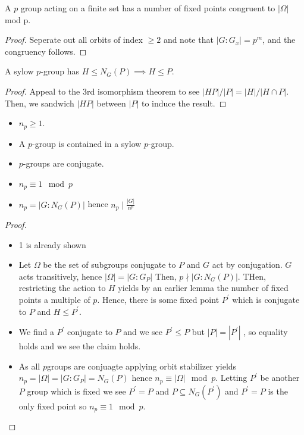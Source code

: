 \begin{theorem}
	A \(p\) group acting on a finite set has a number of fixed points congruent to \(\left| \Omega \right| \)  mod p.
\end{theorem}
\begin{proof}
	Seperate out all orbits of index \(\ge 2\) and note that \(\left| G : G_{x} \right|  = p^{m}\), and the congruency follows.
\end{proof}
\begin{theorem}
	A sylow \(p\)-group has \(H \le N_{G}\left( P \right) \implies H \le P\).
\end{theorem}
\begin{proof}
	Appeal to the 3rd isomorphism theorem to see \(\left| HP \right|/ \left| P \right|  = \left| H \right| / \left| H \cap P \right| \). Then, we sandwich \(\left| HP \right| \) between \(\left| P \right| \)  to induce the result.
\end{proof}
\begin{theorem}
	\begin{itemize}
		\item  \(n_{p} \ge 1\).
			\item A \(p\)-group is contained in a sylow \(p\)-group.
				\item \(p\)-groups are conjugate.
				\item \(n_{p} \equiv 1 \mod p\)
				\item \(n_{p} = \left| G : N_{G}\left( P \right)  \right| \) hence \(n_{p}\mid \frac{\left| G \right| }{n^{p}}\)
	\end{itemize}
\end{theorem}
\begin{proof}
	\begin{itemize}
		\item 1 is already shown
		\item Let \(\Omega\) be the set of subgroups conjugate to \(P\) and \(G\) act by conjugation. \(G\) acts transitively, hence \(\left| \Omega \right|  = \left| G : G_{P} \right| \) Then, \(p \nmid \left| G : N_{G}\left( P \right)  \right| \). THen, restricting the action to \(H\) yields by an earlier lemma the number of fixed points a multiple of \(p\). Hence, there is some fixed point \(P^{\prime}\) which is conjugate to \(P\) and \(H \le P^{\prime}\).
		\item We find a \(P^{\prime}\) conjugate to \(P\) and we see \(P^{\prime} \le P\) but \(\left| P \right|  = \left| P^{\prime} \right| \) , so equality holds and we see the claim holds.
		\item As all \(p\)groups are conjuagte applying orbit stabilizer yields \(n_{p}= \left| \Omega \right|  = \left| G : G_{P} \right| = N_{G}\left( P \right) \)  hence \(n_{p}\equiv \left| \Omega \right| \mod p\). Letting \(P^{\prime}\)  be another \(P\) group which is fixed we see \(P^{\prime} = P\) and \(P \subseteq N_{G}\left( P^{\prime} \right) \) and \(P^{\prime} = P\) is the only fixed point so \(n_{p} \equiv 1 \mod p\).
	\end{itemize}
\end{proof}
